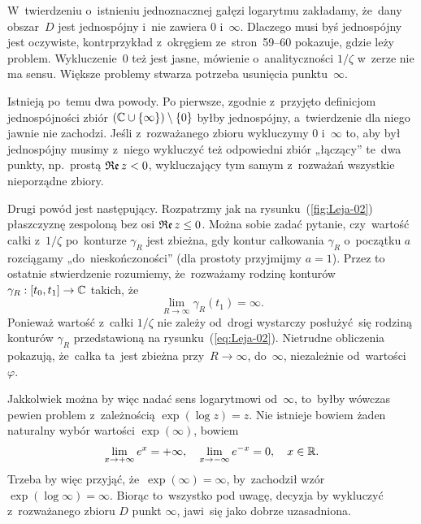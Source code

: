 \documentclass[a4paper,11pt]{article}
\begin{document}
\start {} W~twierdzeniu o~istnieniu jednoznacznej gałęzi
logarytmu zakładamy, że~dany obszar~$D$ jest jednospójny i~nie zawiera
$0$ i~$\infty$. Dlaczego musi byś jednospójny jest oczywiste,
kontrprzykład z~okręgiem ze~stron~59--60 pokazuje, gdzie leży problem.
Wykluczenie~$0$ też jest jasne, mówienie o~analityczności $1 / \zeta$
w~zerze nie ma sensu. Większe problemy stwarza potrzeba usunięcia
punktu~$\infty$.

Istnieją po~temu dwa powody. Po pierwsze, zgodnie z~przyjęto
definicjom jednospójności zbiór
$( \mathbb{C} \cup \{ \infty \} ) \setminus \{ 0 \}$ byłby jednospójny,
a~twierdzenie dla niego jawnie nie zachodzi. Jeśli z~rozważanego
zbioru wykluczymy $0$ i~$\infty$ to, aby był jednospójny musimy
z~niego wykluczyć też odpowiedni zbiór „łączący” te~dwa punkty,
np.~prostą $\operatorname{\mathfrak{Re}} z < 0$, wykluczający tym samym z~rozważań
wszystkie nieporządne zbiory.

Drugi powód jest następujący. Rozpatrzmy jak na
rysunku~(\ref{fig:Leja-02}) płaszczyznę zespoloną bez osi
$\operatorname{\mathfrak{Re}} z \leq 0$. Można sobie zadać pytanie, czy~wartość całki
z~$1 / \zeta$ po~konturze $\gamma_{ R }$ jest zbieżna, gdy kontur
całkowania $\gamma_{ R }$ o~początku $a$ rozciągamy
„do~nieskończoności” (dla prostoty przyjmijmy $a = 1$). Przez to
ostatnie stwierdzenie rozumiemy, że~rozważamy rodzinę konturów
$\gamma_{ R }: [ t_{ 0 }, t_{ 1 } ] \to \mathbb{C}$ takich, że
\begin{equation}
  \label{eq:Leja-39}
  \lim_{ R \to \infty } \gamma_{ R }( t_{ 1 } ) = \infty.
\end{equation}
Ponieważ wartość z~całki $1 / \zeta$ nie zależy od~drogi wystarczy
posłużyć~się rodziną konturów $\gamma_{ R }$ przedstawioną na
rysunku~(\ref{eq:Leja-02}). Nietrudne obliczenia pokazują, że~całka
ta~jest zbieżna przy~$R \to \infty$, do~$\infty$, niezależnie
od~wartości~$\varphi$.

Jakkolwiek można by więc nadać sens logarytmowi od~$\infty$, to~byłby
wówczas pewien problem z~zależnością $\exp( \log z ) = z$. Nie
istnieje bowiem żaden naturalny wybór wartości $\exp( \infty )$, bowiem
\begin{equation}
  \label{eq:Leja-40}
  \lim\limits_{ x \to +\infty } e^{ x } = +\infty, \quad
  \lim\limits_{ x \to -\infty } e^{ -x } = 0, \quad
  x \in \mathbb{R}.
\end{equation}
Trzeba by więc przyjąć, że~$\exp( \infty ) = \infty$, by~zachodził wzór
$\exp( \log \infty ) = \infty$. Biorąc to~wszystko pod uwagę, decyzja
by wykluczyć z~rozważanego zbioru $D$ punkt $\infty$, jawi~się jako
dobrze uzasadniona.
\end{document}
